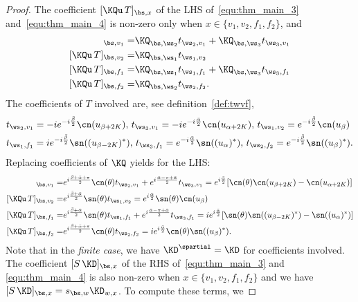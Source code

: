 \documentclass[a4paper,twoside,11pt]{article}
\begin{document}
\begin{proof}
The coefficient $[\KQu\,T]_{\bs,x}$ of the LHS of~\eqref{equ:thm_main_3} and~\eqref{equ:thm_main_4}  is 
non-zero only when $x\in\{v_1,v_2,f_1,f_2\}$, and
\begin{align*}
[\KQu\,T]_{\bs,v_1}=&\KQ_{\bs,\ws_2}t_{\ws_2,v_1}+ \KQ_{\bs,\ws_3}t_{\ws_3,v_1}\\
[\KQu\,T]_{\bs,v_2}=&\KQ_{\bs,\ws_1}t_{\ws_1,v_2}\\
[\KQu\,T]_{\bs,f_1}=&\KQ_{\bs,\ws_1}t_{\ws_1,f_1}+ \KQ_{\bs,\ws_3}t_{\ws_3,f_1}\\
[\KQu\,T]_{\bs,f_2}=&\KQ_{\bs,\ws_2}t_{\ws_2,f_2}.
\end{align*}
The coefficients of $T$ involved are, see definition~\eqref{def:twvf}, 
\begin{align*}
&t_{\ws_2,v_1}=-ie^{-i\frac{\bar{\beta}}{2}}\cn(u_{\beta+2K}),\,
t_{\ws_3,v_1}=-ie^{-i\frac{\bar{\alpha}}{2}}\cn(u_{\alpha+2K}),\,
t_{\ws_1,v_2}=e^{-i\frac{\bar{\beta}}{2}}\cn(u_{\beta})\\
&t_{\ws_1,f_1}=ie^{-i\frac{\bar{\beta}}{2}}\sn((u_{\beta-2K})^*),\,
t_{\ws_3,f_1}=e^{-i\frac{\bar{\alpha}}{2}}\sn((u_{\alpha})^*),\,
t_{\ws_2,f_2}=e^{-i\frac{\bar{\beta}}{2}}\sn((u_{\beta})^*).
\end{align*}
Replacing coefficients of $\KQ$ yields for the LHS:
\begin{align*}
[\KQu\,T]_{\bs,v_1}=&e^{i\frac{\bar{\beta}+\bar{\alpha}+\pi}{2}}\cn(\theta) t_{\ws_2,v_1}+e^{i\frac{\bar{\alpha}-\pi+\bar{\alpha}}{2}}t_{\ws_3,v_1}=
e^{i\frac{\bar{\alpha}}{2}}[\cn(\theta)\cn(u_{\beta+2K})-\cn(u_{\alpha+2K})]\\
[\KQu\,T]_{\bs,v_2}=&e^{i\frac{\bar{\beta}+\bar{\alpha}}{2}}\sn(\theta) t_{\ws_1,v_2}=
e^{i\frac{\bar{\alpha}}{2}}\sn(\theta)\cn(u_{\beta})\\
[\KQu\,T]_{\bs,f_1}=&e^{i\frac{\bar{\beta}+\bar{\alpha}}{2}}\sn(\theta)t_{\ws_1,f_1}+ e^{i\frac{\bar{\alpha}-\pi+\bar{\alpha}}{2}}t_{\ws_3,f_1}
=ie^{i\frac{\bar{\alpha}}{2}}[\sn(\theta)\sn((u_{\beta-2K})^*)-\sn((u_{\alpha})^*)]\\
[\KQu\,T]_{\bs,f_2}=&e^{i\frac{\bar{\beta}+\bar{\alpha}+\pi}{2}}\cn(\theta) t_{\ws_2,f_2}=
ie^{i\frac{\bar{\alpha}}{2}}\cn(\theta)\sn((u_{\beta})^*).
\end{align*}
Note that in the \emph{finite case}, we have $\KD^\spartial=\KD$ for coefficients involved.
The coefficient $[S\, \KD]_{\bs,x}$ of the RHS of~\eqref{equ:thm_main_3} and \eqref{equ:thm_main_4} is also non-zero when $x\in\{v_1,v_2,f_1,f_2\}$
and we have $[S\, \KD]_{\bs,x}=s_{\bs,w}\KD_{w,x}$. 
To compute these terms, we

\end{proof}
\end{document}
